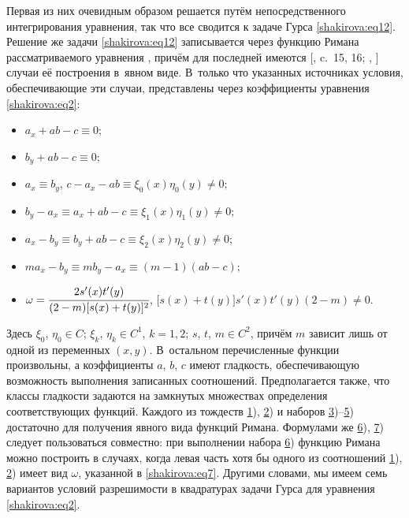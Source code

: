 Первая из них очевидным образом решается путём непосредственного интегрирования уравнения, так что все сводится к задаче Гурса
\eqref{shakirova:eq12}. 
Решение же задачи \eqref{shakirova:eq12} записывается через функцию Римана рассматриваемого уравнения \cite[формула (1.20)]{shakirova:6-ru}, причём для последней имеются  [, c.~15, 16; , ] случаи её построения в~явном виде. 
В~только что указанных источниках условия,  обеспечивающие эти случаи, представлены через коэффициенты уравнения \eqref{shakirova:eq2}:
\begin{itemize}
\item[1)] $a_x+ab-c\equiv 0;$ \hypertarget{shakirova:t1}{}
\item[2)] $b_y+ab-c\equiv 0;$ \hypertarget{shakirova:t2}{}
\item[3)] $a_x\equiv b_y$, $c-a_x-ab\equiv \xi_0(x)\eta_0(y)\neq 0;$ \hypertarget{shakirova:t3}{}
\item[4)] $b_y-a_x\equiv a_x+ab-c\equiv \xi_1(x)\eta_1(y)\neq 0;$ \hypertarget{shakirova:t4}{}
\item[5)] $a_x-b_y\equiv b_y+ab-c\equiv \xi_2(x)\eta_2(y)\neq 0;$ \hypertarget{shakirova:t5}{}
\item[6)] $ma_x-b_y\equiv mb_y-a_x\equiv (m-1)(ab-c);$ \hypertarget{shakirova:t6}{}
\item[7)] $\omega=\cfrac{2s'(x)t'(y)}{(2-m)[s(x)+t(y)]^2}$, $\bigl[s(x)+t(y)\bigr]s'(x)t'(y)(2-m)\neq 0.$ \hypertarget{shakirova:t7}{}
\end{itemize}
Здесь $\xi_0$, $\eta_0\in C$; $\xi_k$, $\eta_k \in C^1$, $k=1, 2$; $s$, $t$, $m\in C^2$, причём $m$ зависит лишь от одной из переменных $(x, y)$. 
В~остальном перечисленные функции произвольны, а коэффициенты $a$, $b$, $c$ имеют гладкость, обеспечивающую возможность выполнения записанных соотношений. 
Предполагается также, что классы гладкости задаются на замкнутых множествах определения соответствующих функций. 
Каждого из тождеств \hyperlink{shakirova:t1}{1}), \hyperlink{shakirova:t2}{2}) и наборов \hyperlink{shakirova:t3}{3})--\hyperlink{shakirova:t5}{5}) достаточно для получения явного вида функций Римана. 
Формулами же \hyperlink{shakirova:t6}{6}), \hyperlink{shakirova:t7}{7}) следует пользоваться совместно: 
при выполнении набора \hyperlink{shakirova:t6}{6}) функцию Римана можно построить в случаях, когда левая часть хотя бы одного из соотношений \hyperlink{shakirova:t1}{1}), \hyperlink{shakirova:t2}{2})  имеет вид $\omega$, указанной в \eqref{shakirova:eq7}. 
Другими словами, мы имеем семь вариантов условий разрешимости в квадратурах задачи Гурса для уравнения \eqref{shakirova:eq2}. 
